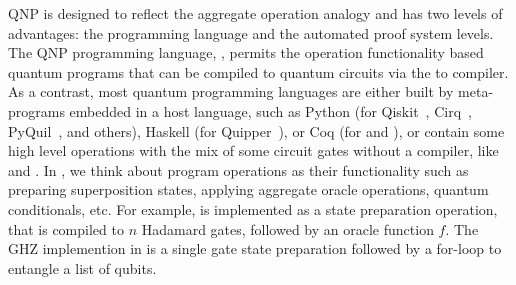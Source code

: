 QNP is designed to reflect the aggregate operation analogy and has two levels of advantages: the programming language and the automated proof system levels. The QNP programming language, \qafny, permits the operation functionality based quantum programs that can be compiled to quantum circuits via the \qafny to \sqir compiler. As a contrast, most quantum programming languages are either built by meta-programs embedded in a host language, such as Python (for Qiskit~\cite{Qiskit}, Cirq~\cite{cirq}, PyQuil~\cite{PyQuil}, and others), Haskell (for Quipper~\cite{Green2013}), or Coq (for \sqir and \voqc \cite{VOQC}), or contain some high level operations with the mix of some circuit gates without a compiler, like \cite{sliqlanguage} and \cite{qsharp}.
In \qafny, we think about program operations as their functionality such as preparing superposition states, applying aggregate oracle operations, quantum conditionals, etc. For example,  is implemented as a state preparation operation, that is compiled to $n$ Hadamard gates, followed by an oracle function $f$. The GHZ \cite{Greenberger1989} implemention in  is a single gate state preparation followed by a for-loop to entangle a list of qubits. 



